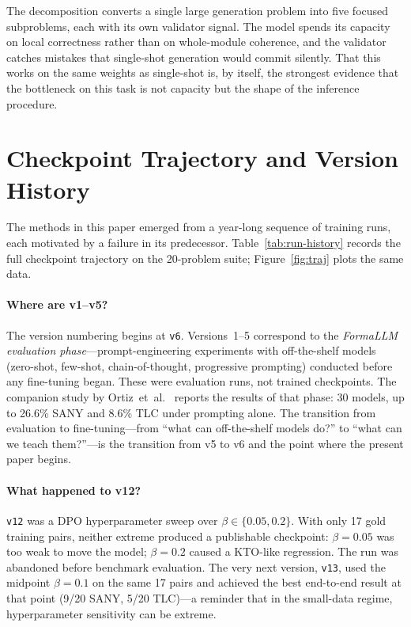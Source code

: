 \documentclass[11pt]{article}
\begin{document}
The decomposition converts a single large generation problem
into five focused subproblems, each with its own validator signal.
The model spends its capacity on local correctness rather than on
whole-module coherence, and the validator catches mistakes that
single-shot generation would commit silently. That this works on the
same weights as single-shot is, by itself, the strongest evidence
that the bottleneck on this task is not capacity but the shape of
the inference procedure.

\section{Checkpoint Trajectory and Version History}
\label{sec:versions}

The methods in this paper emerged from a year-long sequence of
training runs, each motivated by a failure in its predecessor.
Table~\ref{tab:run-history} records the full checkpoint trajectory
on the 20-problem suite; Figure~\ref{fig:traj} plots the same data.

\paragraph{Where are v1--v5?}  The version numbering begins at
\texttt{v6}.  Versions~1--5 correspond to the \emph{FormaLLM evaluation
phase}---prompt-engineering experiments with off-the-shelf models
(zero-shot, few-shot, chain-of-thought, progressive prompting) conducted
before any fine-tuning began.  These were evaluation runs, not trained
checkpoints.  The companion study by Ortiz~et~al.~\cite{ortiz2026formallm}
reports the results of that phase: 30 models, up to 26.6\% SANY and
8.6\% TLC under prompting alone.  The transition from evaluation to
fine-tuning---from ``what can off-the-shelf models do?'' to ``what can
we teach them?''---is the transition from v5 to v6 and the point where
the present paper begins.

\paragraph{What happened to v12?}  \texttt{v12} was a DPO
hyperparameter sweep over $\beta \in \{0.05, 0.2\}$.  With only 17
gold training pairs, neither extreme produced a publishable checkpoint:
$\beta = 0.05$ was too weak to move the model; $\beta = 0.2$ caused a
KTO-like regression.  The run was abandoned before benchmark evaluation.
The very next version, \texttt{v13}, used the midpoint $\beta = 0.1$ on
the same 17 pairs and achieved the best end-to-end result at that point
(9/20 SANY, 5/20 TLC)---a reminder that in the small-data regime,
hyperparameter sensitivity can be extreme.
\end{document}
